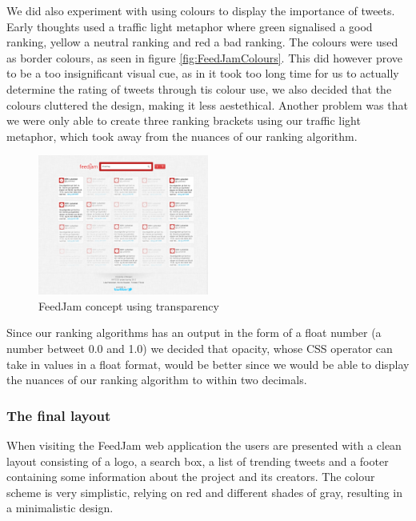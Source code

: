 We did also experiment with using colours to display the importance of tweets. Early thoughts used a traffic light metaphor where green signalised a good ranking, yellow a neutral ranking and red a bad ranking. The colours were used as border colours, as seen in figure  \ref{fig:FeedJamColours}. This did however prove to be a too insignificant visual cue, as in it took too long time for us to actually determine the rating of tweets through tis colour use, we also decided that the colours cluttered the design, making it less aestethical. Another problem was that we were only able to create three ranking brackets using our traffic light metaphor, which took away from the nuances of our ranking algorithm.

\begin{figure}[ht]
    \begin{minipage}[b]{1\linewidth}
        \centering
        \includegraphics[width=0.5\textwidth]{figures/layout_transparency}
        \caption{FeedJam concept using transparency}
        \label{fig:FeedJamTransparency}
    \end{minipage}
\end{figure}


Since our ranking algorithms has an output in the form of a float number (a number betweet 0.0 and 1.0) we decided that opacity, whose CSS operator can take in values in a float format, would be better since we would be able to display the nuances of our ranking algorithm to within two decimals.


\subsubsection{The final layout}
When visiting the FeedJam web application the users are presented with a clean layout consisting of a logo, a search box, a list of trending tweets and a footer containing some information about the project and its creators. The colour scheme is very simplistic, relying on red and different shades of gray, resulting in a minimalistic design.

